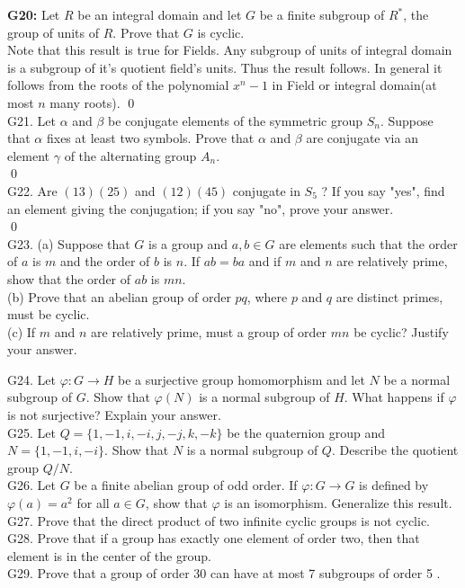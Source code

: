 \textbf{G20:} Let $R$ be an integral domain and let $G$ be a finite subgroup of $R^{*}$, the group of units of $R$. Prove that $G$ is cyclic.\\
\soln
Note that this result is true for Fields. Any subgroup of units of integral domain is a subgroup of it's quotient field's units. Thus the result follows. In general it follows from the roots of the polynomial $ x^n-1 $ in Field or integral domain(at most $ n $ many roots).
\qed\\

G21. Let $\alpha$ and $\beta$ be conjugate elements of the symmetric group $S_{n}$. Suppose that $\alpha$ fixes at least two symbols. Prove that $\alpha$ and $\beta$ are conjugate via an element $\gamma$ of the alternating group $A_{n}$.\\

\soln
\qed\\

G22. Are $(13)(25)$ and $(12)(45)$ conjugate in $S_{5}$ ? If you say "yes", find an element giving the conjugation; if you say "no", prove your answer.\\

\soln
\qed\\

G23. (a) Suppose that $G$ is a group and $a, b \in G$ are elements such that the order of $a$ is $m$ and the order of $b$ is $n$. If $a b=b a$ and if $m$ and $n$ are relatively prime, show that the order of $a b$ is $m n$.\\
(b) Prove that an abelian group of order $p q$, where $p$ and $q$ are distinct primes, must be cyclic.\\
(c) If $m$ and $n$ are relatively prime, must a group of order $m n$ be cyclic? Justify your answer.

G24. Let $\varphi: G \rightarrow H$ be a surjective group homomorphism and let $N$ be a normal subgroup of $G$. Show that $\varphi(N)$ is a normal subgroup of $H$. What happens if $\varphi$ is not surjective? Explain your answer.\\
G25. Let $Q=\{1,-1, i,-i, j,-j, k,-k\}$ be the quaternion group and $N=\{1,-1, i,-i\}$. Show that $N$ is a normal subgroup of $Q$. Describe the quotient group $Q / N$.\\
G26. Let $G$ be a finite abelian group of odd order. If $\varphi: G \rightarrow G$ is defined by $\varphi(a)=a^{2}$ for all $a \in G$, show that $\varphi$ is an isomorphism. Generalize this result.\\
G27. Prove that the direct product of two infinite cyclic groups is not cyclic.\\
G28. Prove that if a group has exactly one element of order two, then that element is in the center of the group.\\
G29. Prove that a group of order 30 can have at most 7 subgroups of order 5 .


